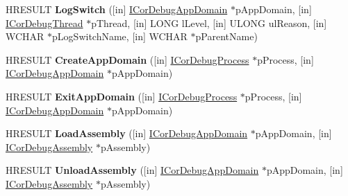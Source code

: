 \begin{DoxyCompactItemize}
H\+R\+E\+S\+U\+LT {\bfseries Log\+Switch} (\mbox{[}in\mbox{]} \hyperlink{interface_i_cor_debug_app_domain}{I\+Cor\+Debug\+App\+Domain} $\ast$p\+App\+Domain, \mbox{[}in\mbox{]} \hyperlink{interface_i_cor_debug_thread}{I\+Cor\+Debug\+Thread} $\ast$p\+Thread, \mbox{[}in\mbox{]} L\+O\+NG l\+Level, \mbox{[}in\mbox{]} U\+L\+O\+NG ul\+Reason, \mbox{[}in\mbox{]} W\+C\+H\+AR $\ast$p\+Log\+Switch\+Name, \mbox{[}in\mbox{]} W\+C\+H\+AR $\ast$p\+Parent\+Name)
\item 
\mbox{\label{interface_i_cor_debug_managed_callback_a13d06f7b2319448c41132f2af21c2b05}} 
H\+R\+E\+S\+U\+LT {\bfseries Create\+App\+Domain} (\mbox{[}in\mbox{]} \hyperlink{interface_i_cor_debug_process}{I\+Cor\+Debug\+Process} $\ast$p\+Process, \mbox{[}in\mbox{]} \hyperlink{interface_i_cor_debug_app_domain}{I\+Cor\+Debug\+App\+Domain} $\ast$p\+App\+Domain)
\item 
\mbox{\label{interface_i_cor_debug_managed_callback_a7be0b6427789e6ac4bacd89809059cc6}} 
H\+R\+E\+S\+U\+LT {\bfseries Exit\+App\+Domain} (\mbox{[}in\mbox{]} \hyperlink{interface_i_cor_debug_process}{I\+Cor\+Debug\+Process} $\ast$p\+Process, \mbox{[}in\mbox{]} \hyperlink{interface_i_cor_debug_app_domain}{I\+Cor\+Debug\+App\+Domain} $\ast$p\+App\+Domain)
\item 
\mbox{\label{interface_i_cor_debug_managed_callback_aef49db5857f2d22541366d5350aff877}} 
H\+R\+E\+S\+U\+LT {\bfseries Load\+Assembly} (\mbox{[}in\mbox{]} \hyperlink{interface_i_cor_debug_app_domain}{I\+Cor\+Debug\+App\+Domain} $\ast$p\+App\+Domain, \mbox{[}in\mbox{]} \hyperlink{interface_i_cor_debug_assembly}{I\+Cor\+Debug\+Assembly} $\ast$p\+Assembly)
\item 
\mbox{\label{interface_i_cor_debug_managed_callback_a4db3d4c0f1c0745ce08eb93f1299e7b5}} 
H\+R\+E\+S\+U\+LT {\bfseries Unload\+Assembly} (\mbox{[}in\mbox{]} \hyperlink{interface_i_cor_debug_app_domain}{I\+Cor\+Debug\+App\+Domain} $\ast$p\+App\+Domain, \mbox{[}in\mbox{]} \hyperlink{interface_i_cor_debug_assembly}{I\+Cor\+Debug\+Assembly} $\ast$p\+Assembly)
\item 
\mbox{\label{interface_i_cor_debug_managed_callback_ad977bd03c6dcbe973963f51949e97b38}} 

\end{DoxyCompactItemize}
